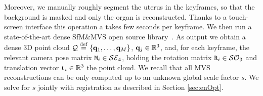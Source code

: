 Moreover, we manually roughly segment the uterus in the keyframes, so that the background is masked and only the organ is reconstructed. Thanks to a touch-screen interface this operation a takes few seconds per keyframe.
We then run a state-of-the-art dense SfM\&MVS open source library~\cite{AliceVision}. 
As output we obtain a dense 3D point cloud $\mathcal{Q}\overset{\mathrm{def}}{=}\{\mathbf{q}_{1},\dots,\mathbf{q}_{M}\}$, $\mathbf{q}_{j}\in\mathbb{R}^{3}$, and, for each keyframe, the relevant camera pose matrix $\mat{M}_i \in \mathcal{SE}_4$, holding the rotation matrix $\mat{R}_{i}\in\mathcal{SO}_3$ and translation vector $\mathbf{t}_{i}\in\mathbb{R}^3$ \wrt the point cloud.
We recall that all MVS reconstructions can be only computed up to an unknown global scale factor $s$. We solve for $s$ jointly with registration as described in Section \ref{sec:enOpt}.




